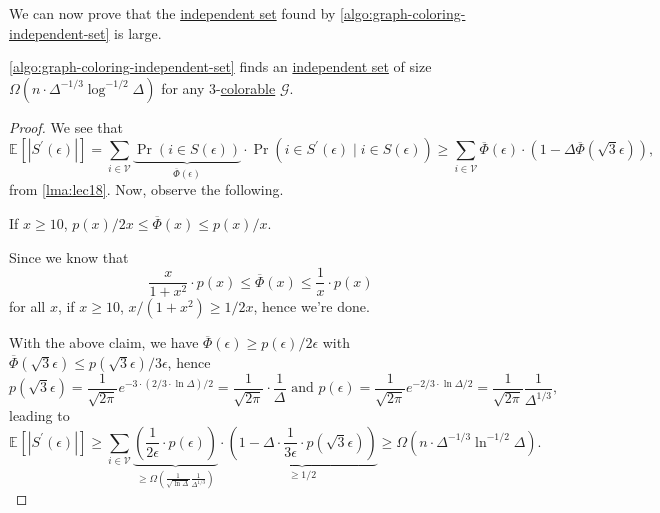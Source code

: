 We can now prove that the \hyperref[def:independent-set]{independent set} found by \autoref{algo:graph-coloring-independent-set} is large.

\begin{theorem}\label{thm:lec18}
	\autoref{algo:graph-coloring-independent-set} finds an \hyperref[def:independent-set]{independent set} of size \(\Omega (n\cdot \Delta ^{-1 / 3}\log^{-1 / 2} \Delta )\) for any \(3\)-\hyperref[def:coloring]{colorable} \(\mathcal{G} \).
\end{theorem}
\begin{proof}
	We see that
	\[
		\mathbb{E}_{}\left[\left\vert S^\prime (\epsilon ) \right\vert  \right]
		= \sum_{i\in \mathcal{V} } \underbrace{\Pr_{}(i\in S(\epsilon ))}_{\overline{\Phi }(\epsilon )}\cdot \Pr_{}(i\in S^\prime (\epsilon )\mid i\in S(\epsilon ))
		\geq  \sum_{i\in \mathcal{V} } \overline{\Phi }(\epsilon )\cdot \left( 1 - \Delta \overline{\Phi }(\sqrt{3}\epsilon  ) \right),
	\]
	from \autoref{lma:lec18}. Now, observe the following.

	\begin{claim}
		If \(x \geq 10\), \(p(x) / 2x \leq \overline{\Phi}(x) \leq p(x) / x\).
	\end{claim}
	\begin{explanation}
		Since we know that
		\[
			\frac{x}{1+x^{2} }\cdot p(x) \leq \overline{\Phi }(x) \leq \frac{1}{x}\cdot p(x)
		\]
		for all \(x\), if \(x \geq 10\), \(x / (1 + x^{2} ) \geq 1 / 2x\), hence we're done.
	\end{explanation}

	With the above claim, we have \(\overline{\Phi }(\epsilon )\geq p(\epsilon ) / 2\epsilon \) with \(\overline{\Phi }(\sqrt{3}\epsilon) \leq p(\sqrt{3}\epsilon) / 3\epsilon\), hence
	\[
		p(\sqrt{3} \epsilon )
		= \frac{1}{\sqrt{2\pi } } e^{- 3\cdot (2 / 3 \cdot \ln \Delta ) / 2}
		= \frac{1}{\sqrt{2\pi } }\cdot \frac{1}{\Delta }
		\text{ and }p(\epsilon )
		= \frac{1}{\sqrt{2\pi } } e^{- 2 / 3 \cdot \ln \Delta / 2}
		= \frac{1}{\sqrt{2\pi } }\frac{1}{\Delta ^{1 / 3}},
	\]
	leading to
	\[
		\mathbb{E}_{}\left[\left\vert S^\prime (\epsilon ) \right\vert  \right]
		\geq \sum_{i\in \mathcal{V} } \underbrace{\left( \frac{1}{2\epsilon }\cdot p(\epsilon ) \right)}_{\geq \Omega (\frac{1}{\sqrt{\ln \Delta } } \frac{1}{\Delta ^{1 / 3}})} \cdot \underbrace{\left( 1 - \Delta \cdot \frac{1}{3\epsilon }\cdot p(\sqrt{3} \epsilon ) \right)}_{\geq 1 / 2}
		\geq \Omega (n\cdot \Delta ^{-1 / 3} \ln ^{-1 / 2}\Delta ).
	\]
\end{proof}

